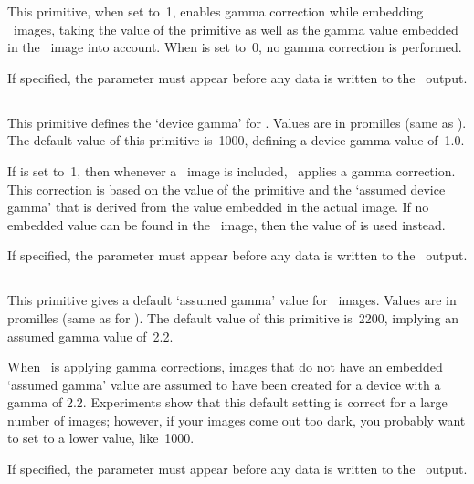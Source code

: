 \documentclass{pdftexmanual}
\begin{document}
This primitive, when set to~1, enables gamma correction while embedding
\PNG\ images, taking the value of the primitive  as
well as the gamma value embedded in the \PNG\ image into account. When
 is set to~0, no gamma correction is
performed.

If specified, the parameter must appear before any data is written to
the \PDF\ output. 

\subsection{}

This primitive defines the `device gamma' for \PDFTEX. Values are in
promilles (same as ). The default value of this primitive
is~1000, defining a device gamma value of~1.0.

If  is set to~1, then whenever a \PNG\ image is
included, \PDFTEX\ applies a gamma correction. This correction is based
on the value of the  primitive and the `assumed device
gamma' that is derived from the value embedded in the actual image. If
no embedded value can be found in the \PNG\ image, then the value of
 is used instead.

If specified, the parameter must appear before any data is written to
the \PDF\ output. 

\subsection{}

This primitive gives a default `assumed gamma' value for \PNG\ images.
Values are in promilles (same as for ). The default value
of this primitive is~2200, implying an assumed gamma value of~2.2.

When \PDFTEX\ is applying gamma corrections, images that do not have an
embedded `assumed gamma' value are assumed to have been created for a
device with a gamma of 2.2. Experiments show that this default setting
is correct for a large number of images; however, if your images come
out too dark, you probably want to set  to a lower
value, like~1000.

If specified, the parameter must appear before any data is written to
the \PDF\ output. 
\end{document}
